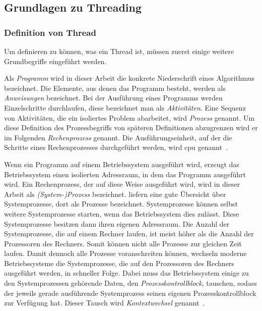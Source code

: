 \subsection{Grundlagen zu Threading}


\subsubsection{Definition von Thread}
Um definieren zu können, was ein Thread ist, müssen zuerst einige weitere Grundbegriffe eingeführt werden. 

Als \emph{Programm} wird in dieser Arbeit die konkrete Niederschrift eines Algorithmus bezeichnet. Die Elemente, aus denen das Programm besteht, werden als \emph{Anweisungen} bezeichnet. Bei der Ausführung eines Programms werden Einzelschritte durchlaufen, diese bezeichnet man als \emph{Aktivitäten}. Eine Sequenz von Aktivitäten, die ein isoliertes Problem abarbeitet, wird \emph{Prozess} genannt. Um diese Definition des Prozessbegriffs von späteren Definitionen abzugrenzen wird er im Folgenden \emph{Rechenprozess} genannt. Die Ausführungseinheit, auf der die Schritte eines Rechenprozesses durchgeführt werden, wird \ac{cpu} genannt~\cite[S.~22]{Herrtwich1989}.

Wenn ein Programm auf einem Betriebssystem ausgeführt wird, erzeugt das Betriebssystem einen isolierten Adressraum, in dem das Programm ausgeführt wird. Ein Rechenprozess, der auf diese Weise ausgeführt wird, wird in dieser Arbeit als \emph{(System-)Prozess} bezeichnet. \textcite[Kapitel~2]{Tanenbaum2016} liefern eine gute Übersicht über Systemprozesse, dort als Prozesse bezeichnet. Systemprozesse können selbst weitere Systemprozesse starten, wenn das Betriebssystem dies zulässt. Diese Systemprozesse besitzen dann ihren eigenen Adressraum. Die Anzahl der Systemprozesse, die auf einem Rechner laufen, ist meist höher als die Anzahl der Prozessoren des Rechners. Somit können nicht alle Prozesse zur gleichen Zeit laufen. Damit dennoch alle Prozesse voranschreiten können, wechseln moderne Betriebssysteme die Systemprozesse, die auf den Prozessoren des Rechners ausgeführt werden, in schneller Folge. Dabei muss das Betriebssystem einige zu den Systemprozessen gehörende Daten, den \emph{Prozesskontrollblock}, tauschen, sodass der jeweils gerade ausführende Systemprozess seinen eigenen Prozesskontrollblock zur Verfügung hat. Dieser Tausch wird \emph{Kontextwechsel} genannt~\cite[S.~59]{Tanenbaum2016}.


